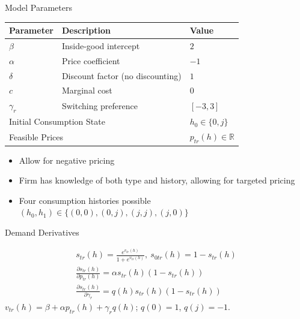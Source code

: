 \gdef\shortbuttons{\hyperlink{short-14}{\beamergotobutton{Back}}}
\begin{frame}[label=short-12,noframenumbering]{Model Parameters}
  \centering
  \small
  \begin{tabular}{lll}
    \toprule
    Parameter & Description & Value \\
    \midrule
    $\beta$ & Inside-good intercept & $2$ \\
    $\alpha$ & Price coefficient & $-1$ \\
    $\delta$ & Discount factor (no discounting) & $1$ \\
    $c$ & Marginal cost & $0$ \\
    $\gamma_r$ & Switching preference & $[-3,3]$ \\
    \midrule
    \multicolumn{2}{l}{Initial Consumption State}
      & $h_0\in\{0,j\}$ \\
    \multicolumn{2}{l}{Feasible Prices}
      & $p_{tr}(h)\in\mathbb{R}$ \\
    \bottomrule
  \end{tabular}
  \begin{itemize}
    \item Allow for negative pricing
    \item Firm has knowledge of both type and history, allowing for targeted pricing
    \item Four consumption histories possible $(h_0, h_1) \in \{(0,0), (0,j), (j,j), (j,0)\}$
  \end{itemize}
\end{frame}



\gdef\shortbuttons{\hyperlink{short-10}{\beamergotobutton{Back}}}
\begin{frame}[label=short-52,noframenumbering]{Demand Derivatives}
  \begingroup
  \setlength{\jot}{7pt}

    \begin{gather*}
      s_{tr}(h) = \frac{e^{v_{tr}(h)}}{1+e^{v_{tr}(h)}}, \ s_{0tr}(h) = 1-s_{tr}(h) \\
      \frac{\partial s_{tr}(h)}{\partial p_{tr}(h)} = \alpha s_{tr}(h)(1-s_{tr}(h)) \\
      \frac{\partial s_{tr}(h)}{\partial\gamma_r} = q(h)s_{tr}(h)(1-s_{tr}(h))
    \end{gather*}
  \endgroup
  {\small $v_{tr}(h)=\beta+\alpha p_{tr}(h)+\gamma_r q(h)$; $q(0)=1$, $q(j)=-1$.}
\end{frame}



